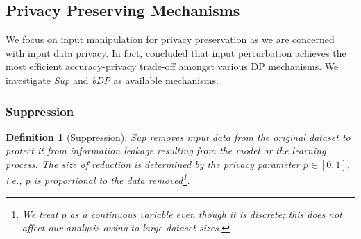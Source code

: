 \documentclass[USenglish,oneside,twocolumn]{article}
\theoremstyle{plain}
\newtheorem{definition}{Definition}
\begin{document}
    
    
    \vspace{-0.5cm}
    \subsection{Privacy Preserving Mechanisms}
    \vspace{-0.25cm}
    
    We focus on input manipulation for  privacy preservation as we are concerned with input data privacy. In fact, \cite{friedman2016differential} concluded that input perturbation achieves the most efficient accuracy-privacy trade-off amongst various DP mechanisms. We investigate \textit{Sup} and \textit{bDP} as available mechanisms. %
    
    \vspace{-0.5cm}
    \subsubsection{Suppression}
    \vspace{-0.25cm}
    \begin{definition}[Suppression]
        Sup removes input data from the original dataset to protect it from information leakage resulting from the model or the learning process. The size of reduction is determined by the privacy parameter $p\in[0,1]$, i.e., $p$ is proportional to the data removed\footnote{We treat $p$ as a continuous variable even though it is discrete; this does not affect our analysis owing to large dataset sizes.}.
    \end{definition}
    \vspace{-0.25cm}
    
\end{document}
